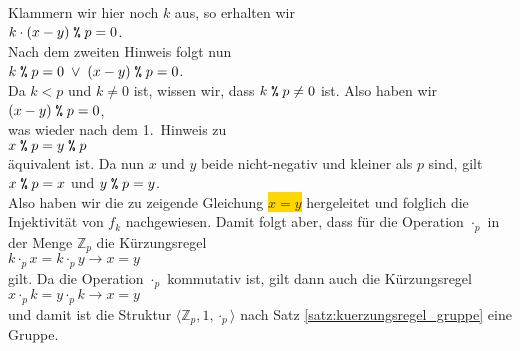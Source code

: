 \\[0.2cm]
Klammern wir hier noch $k$ aus, so erhalten wir
\\[0.2cm]
\hspace*{1.3cm}
$k \cdot (x - y) \;\texttt{\symbol{37}}\;p = 0$.
\\[0.2cm]
Nach dem zweiten Hinweis folgt nun
\\[0.2cm]
\hspace*{1.3cm}
$k \;\texttt{\symbol{37}}\;p = 0 \;\vee\; (x - y) \;\texttt{\symbol{37}}\;p = 0$.
\\[0.2cm]
Da $k < p$ und $k \not= 0$ ist, wissen wir, dass $k \;\texttt{\symbol{37}}\;p \not= 0$ ist.  Also haben wir
\\[0.2cm]
\hspace*{1.3cm}
$(x - y) \;\texttt{\symbol{37}}\;p = 0$,
\\[0.2cm]
was wieder nach dem 1.~Hinweis zu
\\[0.2cm]
\hspace*{1.3cm}
$x \;\texttt{\symbol{37}}\;p = y \;\texttt{\symbol{37}}\;p$
\\[0.2cm]
\"{a}quivalent ist.  Da nun $x$ und $y$ beide nicht-negativ und kleiner als $p$ sind, gilt
\\[0.2cm]
\hspace*{1.3cm}
$x \;\texttt{\symbol{37}}\;p = x$ \quad und $y \;\texttt{\symbol{37}}\;p = y$.
\\[0.2cm]
Also haben wir die zu zeigende Gleichung \colorbox{gold}{$x = y$} 
hergeleitet und folglich die Injektivit\"{a}t von $f_k$ nachgewiesen.  
Damit folgt aber, dass f\"ur die Operation $\cdot_p$ in der Menge $\mathbb{Z}_p$ die K\"urzungsregel
\\[0.2cm]
\hspace*{1.3cm}
$k \cdot_p x = k \cdot_p y \rightarrow x = y$
\\[0.2cm]
gilt.  Da die Operation $\cdot_p$ kommutativ ist, gilt dann auch die K\"urzungsregel 
\\[0.2cm]
\hspace*{1.3cm}
$x \cdot_p k = y \cdot_p k \rightarrow x = y$
\\[0.2cm]
und damit ist die Struktur $\langle \mathbb{Z}_p, 1, \cdot_p \rangle$ nach Satz \ref{satz:kuerzungsregel_gruppe}
eine Gruppe.
\qeds



